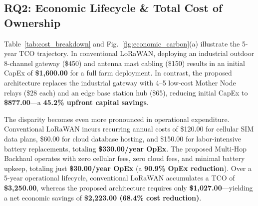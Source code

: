 \documentclass[conference]{IEEEtran}
\begin{document}
\subsection{RQ2: Economic Lifecycle \& Total Cost of Ownership}
Table~\ref{tab:cost_breakdown} and Fig.~\ref{fig:economic_carbon}(a) illustrate the 5-year TCO trajectory. In conventional LoRaWAN, deploying an industrial outdoor 8-channel gateway (\$450) and antenna mast cabling (\$150) results in an initial CapEx of \textbf{\$1,600.00} for a full farm deployment. In contrast, the proposed architecture replaces the industrial gateway with 4--5 low-cost Mother Node relays (\$28 each) and an edge base station hub (\$65), reducing initial CapEx to \textbf{\$877.00}—a \textbf{45.2\% upfront capital savings}.

The disparity becomes even more pronounced in operational expenditure. Conventional LoRaWAN incurs recurring annual costs of \$120.00 for cellular SIM data plans, \$60.00 for cloud database hosting, and \$150.00 for labor-intensive battery replacements, totaling \textbf{\$330.00/year OpEx}. The proposed Multi-Hop Backhaul operates with zero cellular fees, zero cloud fees, and minimal battery upkeep, totaling just \textbf{\$30.00/year OpEx} (a \textbf{90.9\% OpEx reduction}). Over a 5-year operational lifecycle, conventional LoRaWAN accumulates a TCO of \textbf{\$3,250.00}, whereas the proposed architecture requires only \textbf{\$1,027.00}—yielding a net economic savings of \textbf{\$2,223.00 (68.4\% cost reduction)}.
\end{document}
